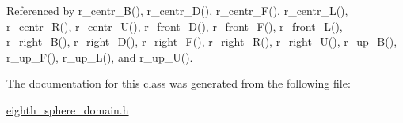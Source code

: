 Referenced by r\+\_\+centr\+\_\+\+B(), r\+\_\+centr\+\_\+\+D(), r\+\_\+centr\+\_\+\+F(), r\+\_\+centr\+\_\+\+L(), r\+\_\+centr\+\_\+\+R(), r\+\_\+centr\+\_\+\+U(), r\+\_\+front\+\_\+\+D(), r\+\_\+front\+\_\+\+F(), r\+\_\+front\+\_\+\+L(), r\+\_\+right\+\_\+\+B(), r\+\_\+right\+\_\+\+D(), r\+\_\+right\+\_\+\+F(), r\+\_\+right\+\_\+\+R(), r\+\_\+right\+\_\+\+U(), r\+\_\+up\+\_\+\+B(), r\+\_\+up\+\_\+\+F(), r\+\_\+up\+\_\+\+L(), and r\+\_\+up\+\_\+\+U().



The documentation for this class was generated from the following file\+:\begin{DoxyCompactItemize}
\item 
\hyperlink{eighth__sphere__domain_8h}{eighth\+\_\+sphere\+\_\+domain.\+h}\end{DoxyCompactItemize}
